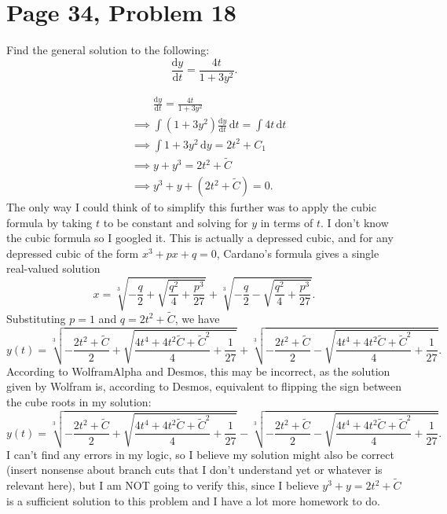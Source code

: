 \documentclass[11pt, letterpaper]{report}
\begin{document}
\section*{Page 34, Problem 18}
Find the general solution to the following:
\[
	\frac{\mathrm{d}y}{\mathrm{d}t} =\frac{4t}{1+3y^2}
.\]
\begin{solution}
	\begin{align*}
		&\qquad \frac{\mathrm{d}y}{\mathrm{d}t} =\frac{4t}{1+3y^2}\\
		&\implies \int \left( 1+3y^2 \right) \frac{\mathrm{d}y}{\mathrm{d}t}  \,\mathrm{d} t=\int 4t \,\mathrm{d} t\\
		&\implies \int 1+3y^2 \,\mathrm{d} y=2t^2+C_1\\
		&\implies y+y^3=2t^2+\tilde{C}\\
		&\implies y^3 + y + \left( 2t^2 +\tilde{C} \right) =0
	.\end{align*}
	The only way I could think of to simplify this further was to apply the cubic formula by taking $t$ to be constant and solving for $y$ in terms of $t$. I don't know the cubic formula so I googled it. This is actually a depressed cubic, and for any depressed cubic of the form $x^3+px+q=0$, Cardano's formula gives a single real-valued solution
	\[
		x=\sqrt[3]{-\frac{q}{2}+\sqrt{\frac{q^2}{4}+\frac{p^3}{27}} } +\sqrt[3]{-\frac{q}{2}-\sqrt{\frac{q^2}{4}+\frac{p^3}{27}} } 
	.\]
	Substituting $p=1$ and $q=2t^2+\tilde{C}$, we have
	\[
		y(t)=\sqrt[3]{-\frac{2t^2+\tilde{C}}{2}+\sqrt{\frac{4t^4+4t^2\tilde{C}+\tilde{C}^2}{4}+\frac{1}{27}} } +\sqrt[3]{-\frac{2t^2+\tilde{C}}{2}-\sqrt{\frac{4t^4+4t^2\tilde{C}+\tilde{C}^2}{4}+\frac{1}{27}} } 
	.\]
	According to WolframAlpha and Desmos, this may be incorrect, as the solution given by Wolfram is, according to Desmos, equivalent to flipping the sign between the cube roots in my solution:
	\[
		y(t)=\sqrt[3]{-\frac{2t^2+\tilde{C}}{2}+\sqrt{\frac{4t^4+4t^2\tilde{C}+\tilde{C}^2}{4}+\frac{1}{27}} } -\sqrt[3]{-\frac{2t^2+\tilde{C}}{2}-\sqrt{\frac{4t^4+4t^2\tilde{C}+\tilde{C}^2}{4}+\frac{1}{27}} } 
	.\]
	I can't find any errors in my logic, so I believe my solution might also be correct (insert nonsense about branch cuts that I don't understand yet or whatever is relevant here), but I am NOT going to verify this, since I believe $y^3+y=2t^2+\tilde{C}$ is a sufficient solution to this problem and I have a lot more homework to do.
\end{solution}
\end{document}
